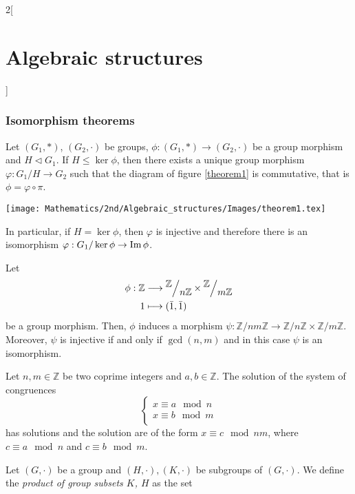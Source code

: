 \documentclass[class=article,10pt,crop=false]{standalone}
\begin{document}
\begin{multicols}{2}[\section{Algebraic structures}]
\subsubsection*{Isomorphism theorems}
\begin{theorem}
Let $(G_1,*)$, $(G_2,\cdot)$ be groups, $\phi:(G_1,*)\rightarrow(G_2,\cdot)$ be a group morphism and $H\lhd G_1$. If $H\leq\ker\phi$, then there exists a unique group morphism $\varphi:G_1/H\rightarrow G_2$ such that the diagram of figure \ref{theorem1} is commutative, that is $\phi=\varphi\circ\pi$.\par
\begin{minipage}{\linewidth}
    \centering
    \texttt{[image: Mathematics/2nd/Algebraic\_structures/Images/theorem1.tex]} 
    \label{theorem1}
\end{minipage}
In particular, if $H=\ker\phi$, then $\varphi$ is injective and therefore there is an isomorphism $\varphi:G_1/\ker\phi\rightarrow\operatorname{Im}\phi$.
\end{theorem}
\begin{theorem}
Let 
\begin{align*}
    \phi:\mathbb{Z}&\longrightarrow\quot{\mathbb{Z}}{n\mathbb{Z}}\times\quot{\mathbb{Z}}{m\mathbb{Z}}\\
    1&\longmapsto(\Bar{1},\Bar{1})
\end{align*}
be a group morphism. Then, $\phi$ induces a morphism $\psi:\mathbb{Z}/nm\mathbb{Z}\rightarrow\mathbb{Z}/n\mathbb{Z}\times\mathbb{Z}/m\mathbb{Z}$. Moreover, $\psi$ is injective if and only if $\gcd(n,m)$ and in this case $\psi$ is an isomorphism. 
\end{theorem}
\begin{corollary}
Let $n,m\in\mathbb{Z}$ be two coprime integers and $a,b\in\mathbb{Z}$. The solution of the system of congruences $$\left\{\begin{array}{l}
    x\equiv a\mod{n}  \\
    x\equiv b\mod{m}  \\
\end{array}\right.$$ has solutions and the solution are of the form $x\equiv c\mod{nm}$, where $c\equiv a\mod{n}$ and $c\equiv b\mod{m}$.
\end{corollary}
\begin{definition}
Let $(G,\cdot)$ be a group and $(H,\cdot),(K,\cdot)$ be subgroups of $(G,\cdot)$. We define the \textit{product of group subsets $K$, $H$} as the set \begin{gather*}

\end{gather*}
\end{definition}
\end{multicols}
\end{document}

